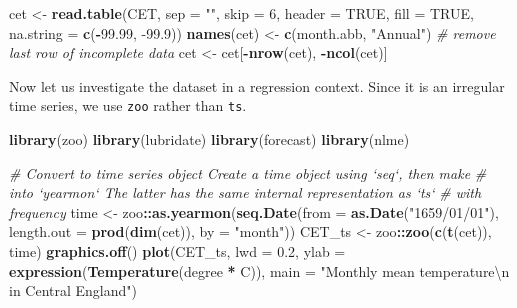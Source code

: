 \documentclass[]{book}
\newenvironment{Shaded}{\begin{snugshade}}{\end{snugshade}}
\newcommand{\CharTok}[1]{\textcolor[rgb]{0.31,0.60,0.02}{#1}}
\newcommand{\CommentTok}[1]{\textcolor[rgb]{0.56,0.35,0.01}{\textit{#1}}}
\newcommand{\DataTypeTok}[1]{\textcolor[rgb]{0.13,0.29,0.53}{#1}}
\newcommand{\DecValTok}[1]{\textcolor[rgb]{0.00,0.00,0.81}{#1}}
\newcommand{\FloatTok}[1]{\textcolor[rgb]{0.00,0.00,0.81}{#1}}
\newcommand{\KeywordTok}[1]{\textcolor[rgb]{0.13,0.29,0.53}{\textbf{#1}}}
\newcommand{\NormalTok}[1]{#1}
\newcommand{\OperatorTok}[1]{\textcolor[rgb]{0.81,0.36,0.00}{\textbf{#1}}}
\newcommand{\OtherTok}[1]{\textcolor[rgb]{0.56,0.35,0.01}{#1}}
\newcommand{\StringTok}[1]{\textcolor[rgb]{0.31,0.60,0.02}{#1}}
\begin{document}
\begin{Shaded}
\begin{Highlighting}[]
\NormalTok{cet <-}\StringTok{ }\KeywordTok{read.table}\NormalTok{(CET, }\DataTypeTok{sep =} \StringTok{""}\NormalTok{, }\DataTypeTok{skip =} \DecValTok{6}\NormalTok{, }\DataTypeTok{header =} \OtherTok{TRUE}\NormalTok{, }\DataTypeTok{fill =} \OtherTok{TRUE}\NormalTok{, }\DataTypeTok{na.string =} \KeywordTok{c}\NormalTok{(}\OperatorTok{-}\FloatTok{99.99}\NormalTok{, }
    \FloatTok{-99.9}\NormalTok{))}
\KeywordTok{names}\NormalTok{(cet) <-}\StringTok{ }\KeywordTok{c}\NormalTok{(month.abb, }\StringTok{"Annual"}\NormalTok{)}
\CommentTok{# remove last row of incomplete data}
\NormalTok{cet <-}\StringTok{ }\NormalTok{cet[}\OperatorTok{-}\KeywordTok{nrow}\NormalTok{(cet), }\OperatorTok{-}\KeywordTok{ncol}\NormalTok{(cet)]}
\end{Highlighting}
\end{Shaded}

Now let us investigate the dataset in a regression context. Since it is an irregular time series, we use \texttt{zoo} rather than \texttt{ts}.

\begin{Shaded}
\begin{Highlighting}[]
\KeywordTok{library}\NormalTok{(zoo)}
\KeywordTok{library}\NormalTok{(lubridate)}
\KeywordTok{library}\NormalTok{(forecast)}
\KeywordTok{library}\NormalTok{(nlme)}
\end{Highlighting}
\end{Shaded}

\begin{Shaded}
\begin{Highlighting}[]
\CommentTok{# Convert to time series object Create a time object using `seq`, then make}
\CommentTok{# into `yearmon` The latter has the same internal representation as `ts`}
\CommentTok{# with frequency}
\NormalTok{time <-}\StringTok{ }\NormalTok{zoo}\OperatorTok{::}\KeywordTok{as.yearmon}\NormalTok{(}\KeywordTok{seq.Date}\NormalTok{(}\DataTypeTok{from =} \KeywordTok{as.Date}\NormalTok{(}\StringTok{"1659/01/01"}\NormalTok{), }\DataTypeTok{length.out =} \KeywordTok{prod}\NormalTok{(}\KeywordTok{dim}\NormalTok{(cet)), }
    \DataTypeTok{by =} \StringTok{"month"}\NormalTok{))}
\NormalTok{CET_ts <-}\StringTok{ }\NormalTok{zoo}\OperatorTok{::}\KeywordTok{zoo}\NormalTok{(}\KeywordTok{c}\NormalTok{(}\KeywordTok{t}\NormalTok{(cet)), time)}
\KeywordTok{graphics.off}\NormalTok{()}
\KeywordTok{plot}\NormalTok{(CET_ts, }\DataTypeTok{lwd =} \FloatTok{0.2}\NormalTok{, }\DataTypeTok{ylab =} \KeywordTok{expression}\NormalTok{(}\KeywordTok{Temperature}\NormalTok{(degree }\OperatorTok{*}\StringTok{ }\NormalTok{C)), }\DataTypeTok{main =} \StringTok{"Monthly mean temperature}\CharTok{\textbackslash{}n}\StringTok{ in Central England"}\NormalTok{)}
\end{Highlighting}
\end{Shaded}
\end{document}
